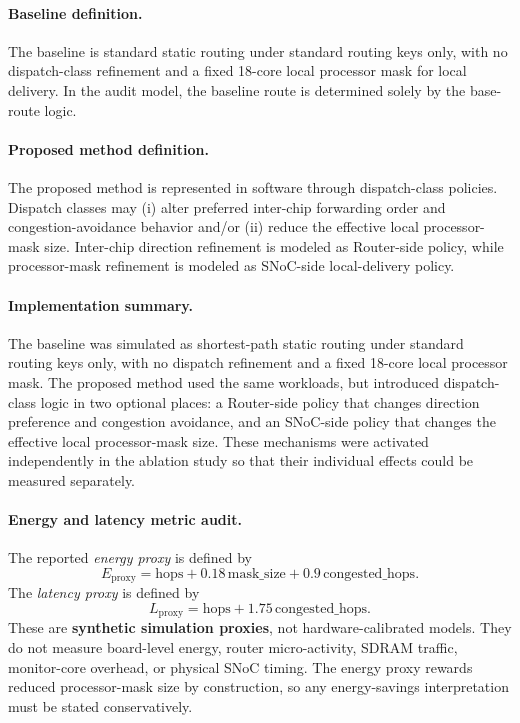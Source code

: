 \documentclass[11pt]{article}
\begin{document}
\paragraph{Baseline definition.}
The baseline is standard static routing under standard routing keys only, with no dispatch-class refinement and a fixed 18-core local processor mask for local delivery. In the audit model, the baseline route is determined solely by the base-route logic.

\paragraph{Proposed method definition.}
The proposed method is represented in software through dispatch-class policies. Dispatch classes may (i) alter preferred inter-chip forwarding order and congestion-avoidance behavior and/or (ii) reduce the effective local processor-mask size. Inter-chip direction refinement is modeled as Router-side policy, while processor-mask refinement is modeled as SNoC-side local-delivery policy.

\paragraph{Implementation summary.}
The baseline was simulated as shortest-path static routing under standard routing keys only, with no dispatch refinement and a fixed 18-core local processor mask. The proposed method used the same workloads, but introduced dispatch-class logic in two optional places: a Router-side policy that changes direction preference and congestion avoidance, and an SNoC-side policy that changes the effective local processor-mask size. These mechanisms were activated independently in the ablation study so that their individual effects could be measured separately.

\paragraph{Energy and latency metric audit.}
The reported \emph{energy proxy} is defined by
\[
E_{\mathrm{proxy}} = \text{hops} + 0.18\,\text{mask\_size} + 0.9\,\text{congested\_hops}.
\]
The \emph{latency proxy} is defined by
\[
L_{\mathrm{proxy}} = \text{hops} + 1.75\,\text{congested\_hops}.
\]
These are \textbf{synthetic simulation proxies}, not hardware-calibrated models. They do not measure board-level energy, router micro-activity, SDRAM traffic, monitor-core overhead, or physical SNoC timing. The energy proxy rewards reduced processor-mask size by construction, so any energy-savings interpretation must be stated conservatively.
\end{document}
